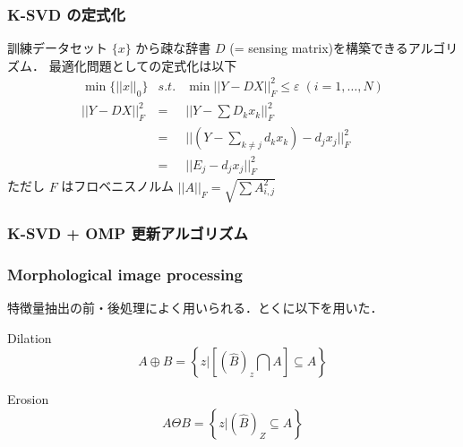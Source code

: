 \begin{frame}\frametitle{K-SVD の定式化}
訓練データセット $\{ x \}$ から疎な辞書 $D$ (= sensing matrix)を構築できるアルゴリズム．
最適化問題としての定式化は以下
\begin{eqnarray}
    \min \{||x||_0\} &s.t.& \min ||Y-DX||^2_F \leq \varepsilon \; (i = 1, \dots, N) \\
    ||Y-DX||^2_F &=& ||Y - \sum D_k x_k||^2_F \\
    &=& ||(Y - \sum_{k \neq j} d_k x_k) - d_j x_j||^2_F \\
    &=& ||E_j - d_j x_j||^2_F
\end{eqnarray}
ただし $F$ はフロベニスノルム $||A||_F = \sqrt{\sum{A^2_{i,j}}}$
\end{frame}


\begin{frame}\frametitle{K-SVD + OMP 更新アルゴリズム}
\end{frame}


\begin{frame}\frametitle{Morphological image processing}
特徴量抽出の前・後処理によく用いられる．とくに以下を用いた．

\begin{block}{Dilation}
\begin{equation}
    A \oplus B = \left\{z | \left[(\hat{B})_z \bigcap A \right] \subseteq A \right\}
\end{equation}
\end{block}

\begin{block}{Erosion}
\begin{equation}
    A \Theta B = \left\{z | (\hat{B})_Z \subseteq A \right\}
\end{equation}
\end{block}
\end{frame}
